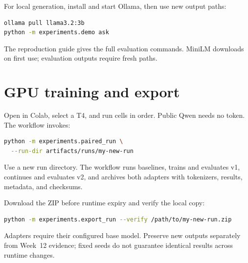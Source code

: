 \documentclass[11pt,letterpaper,oneside]{report}
\begin{document}
For local generation, install and start Ollama, then use new output paths:
\begin{lstlisting}[language=bash]
ollama pull llama3.2:3b
python -m experiments.demo ask
\end{lstlisting}
The reproduction guide gives the full evaluation commands. MiniLM downloads on first use; evaluation outputs require fresh paths.

\section{GPU training and export}
Open  in Colab, select a T4, and run cells in order. Public Qwen needs no token. The workflow invokes:
\begin{lstlisting}[language=bash]
python -m experiments.paired_run \
  --run-dir artifacts/runs/my-new-run
\end{lstlisting}
Use a new run directory. The workflow runs baselines, trains and evaluates v1, continues and evaluates v2, and archives both adapters with tokenizers, results, metadata, and checksums.

Download the ZIP before runtime expiry and verify the local copy:
\begin{lstlisting}[language=bash]
python -m experiments.export_run --verify /path/to/my-new-run.zip
\end{lstlisting}
Adapters require their configured base model. Preserve new outputs separately from Week~12 evidence; fixed seeds do not guarantee identical results across runtime changes.
\end{document}
